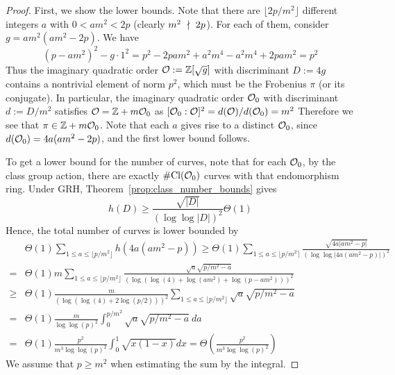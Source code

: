 \begin{proof}
    First, we show the lower bounds.
    Note that there are $\lfloor 2p/m^2 \rfloor$ different integers $a$ with $0 < am^2 < 2p$ (clearly $m^2 \ \nmid \  2p$).
    For each of them, consider $g = am^2(am^2 - 2p)$.
    We have
    \begin{equation*}
        (p - am^2)^2 - g \cdot 1^2 = p^2 - 2pam^2 + a^2m^4 - a^2m^4 + 2pam^2 = p^2
    \end{equation*}
    Thus the imaginary quadratic order $\mathcal{O} := \mathbb{Z}[\sqrt{g}]$ with discriminant $D := 4g$ contains a nontrivial element of norm $p^2$, which must be the Frobenius $\pi$ (or its conjugate).
    In particular, the imaginary quadratic order $\mathcal{O}_0$ with discriminant $d := D/m^2$ satisfies $\mathcal{O} = \mathbb{Z} + m\mathcal{O}_0$ as $[\mathcal{O}_0 : \mathcal{O}]^2 = d(\mathcal{O})/d(\mathcal{O}_0) = m^2$
    Therefore we see that $\pi \in \mathbb{Z} + m\mathcal{O}_0$.
    Note that each $a$ gives rise to a distinct $\mathcal{O}_0$, since $d(\mathcal{O}_0) = 4a(am^2 - 2p)$, and the first lower bound follows.

    To get a lower bound for the number of curves, note that for each $\mathcal{O}_0$, by the class group action, there are exactly $\#\mathrm{Cl}(\mathcal{O}_0)$ curves with that endomorphism ring.
    Under GRH, Theorem~\ref{prop:class_number_bounds} gives
    \begin{equation*}
        h(D) \geq \frac {\sqrt{|D|}} {(\log\log|D|)^2} \Theta(1)
    \end{equation*}
    Hence, the total number of curves is lower bounded by
    \begin{align*}
        &\Theta(1) \sum_{1 \leq a \leq \lfloor p/m^2 \rfloor} h(4a(am^2 - p)) \geq \Theta(1) \sum_{1 \leq a \leq \lfloor p/m^2 \rceil} \frac {\sqrt{4a|am^2 - p|}} {(\log\log|4a(am^2 - p)|)^2} \\
        =& \Theta(1) m \sum_{1 \leq a \leq \lfloor p/m^2 \rfloor} \frac {\sqrt{a} \sqrt{p/m^2 - a}} {(\log(\log(4) + \log(am^2) + \log(p - am^2)))^2} \\
        \geq& \Theta(1) \frac {m} {(\log(\log(4) + 2\log(p/2)))^2} \sum_{1 \leq a \leq \lfloor p/m^2 \rfloor} \sqrt{a} \sqrt{p/m^2 - a} \\
        =& \Theta(1) \frac {m} {\log\log(p)^2} \int_0^{p/m^2} \sqrt{a} \sqrt{p/m^2 - a} \ da \\
        =& \Theta(1) \frac {p^2} {m^3 \log\log(p)^2} \int_0^1 \sqrt{x(1 - x)} dx = \Theta\left( \frac {p^2} {m^3 \log\log(p)^2} \right)
    \end{align*}
    We assume that $p \geq m^2$ when estimating the sum by the integral.


\end{proof}
